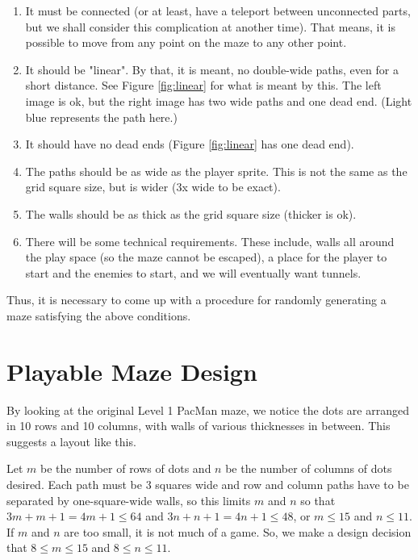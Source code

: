\documentclass[12pt]{amsbook}
\theoremstyle{definition}
\theoremstyle{remark}
\numberwithin{figure}{chapter}
\numberwithin{table}{chapter}
\numberwithin{section}{chapter}
\numberwithin{equation}{section}
\begin{document}
\begin{enumerate}
\item It must be connected (or at least, have a teleport between unconnected parts, but we shall consider this complication at another time).   That means, it is possible to move from any point on the maze to any other point.  

\item It should be "linear".  By that, it is meant, no double-wide paths, even for a short distance.  See Figure \ref{fig:linear} for what is meant by this.  The left image is ok, but the right image has two wide paths and one dead end.  (Light blue represents the path here.)

\item It should have no dead ends (Figure \ref{fig:linear} has one dead end).

\item The paths should be as wide as the player sprite.  This is not the same as the grid square size, but is wider (3x wide to be exact).

\item The walls should be as thick as the grid square size (thicker is ok).

\item There will be some technical requirements.  These include, walls all around the play space (so the maze cannot be escaped), a place for the player to start and the enemies to start, and we will eventually want tunnels.
\end{enumerate}

Thus, it is necessary to come up with a procedure for randomly generating a maze satisfying the above conditions. 

\section{Playable Maze Design}
By looking at the original Level 1 PacMan maze, we notice the dots are arranged in 10 rows and 10 columns, with walls of various thicknesses in between.  This suggests a layout like this.

Let $m$ be the number of rows of dots and $n$ be the number of columns of dots desired.  Each path must be 3 squares wide and row and column paths have to be separated by one-square-wide walls, so this limits $m$ and $n$ so that $3m+m+1=4m+1\le64$ and $3n+n+1=4n+1\le48$, or $m\le{15}$ and $n\le{11}$.  If $m$ and $n$ are too small, it is not much of a game.  So, we make a design decision that $8\le{m}\le15$ and $8\le{n}\le11$.  
\end{document}
